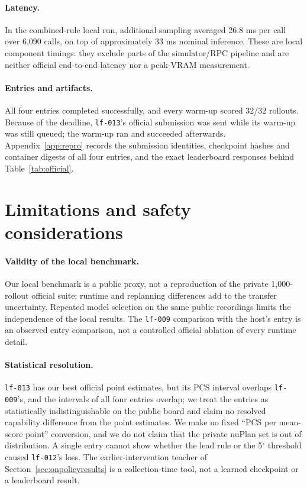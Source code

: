 \documentclass{article}
\newcommand{\lf}{\texttt{lf-009}}
\begin{document}
\paragraph{Latency.}
In the combined-rule local run, additional sampling averaged 26.8 ms per call over 6,090 calls, on top of approximately 33 ms nominal inference. These are local component timings: they exclude parts of the simulator/RPC pipeline and are neither official end-to-end latency nor a peak-VRAM measurement.

\paragraph{Entries and artifacts.}
All four entries completed successfully, and every warm-up scored 32/32 rollouts. Because of the deadline, \texttt{lf-013}'s official submission was sent while its warm-up was still queued; the warm-up ran and succeeded afterwards. Appendix~\ref{app:repro} records the submission identities, checkpoint hashes and container digests of all four entries, and the exact leaderboard responses behind Table~\ref{tab:official}.

\section{Limitations and safety considerations}\label{sec:limits}
\paragraph{Validity of the local benchmark.}
Our local benchmark is a public proxy, not a reproduction of the private 1,000-rollout official suite; runtime and replanning differences add to the transfer uncertainty. Repeated model selection on the same public recordings limits the independence of the local results. The \lf{} comparison with the host's entry is an observed entry comparison, not a controlled official ablation of every runtime detail.

\paragraph{Statistical resolution.}
\texttt{lf-013} has our best official point estimates, but its PCS interval overlaps \lf{}'s, and the intervals of all four entries overlap; we treat the entries as statistically indistinguishable on the public board and claim no resolved capability difference from the point estimates. We make no fixed ``PCS per mean-score point'' conversion, and we do not claim that the private nuPlan set is out of distribution. A single entry cannot show whether the lead rule or the 5$^\circ$ threshold caused \texttt{lf-012}'s loss. The earlier-intervention teacher of Section~\ref{sec:onpolicyresults} is a collection-time tool, not a learned checkpoint or a leaderboard result.
\end{document}
